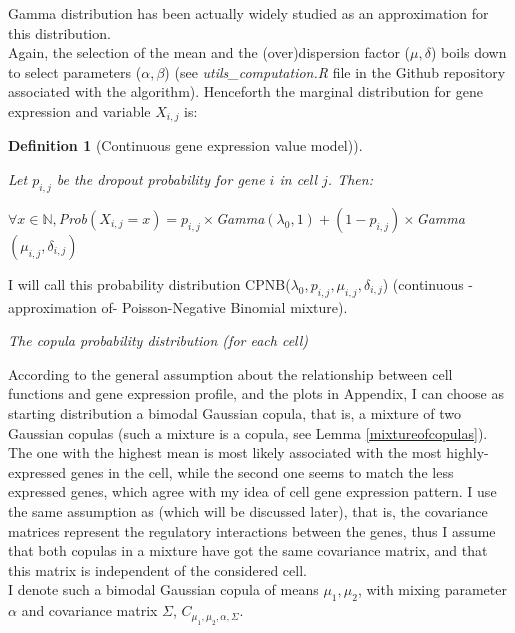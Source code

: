 \documentclass{report}
\newtheorem{definition}{Definition}[section]
\begin{document}
Gamma distribution has been actually widely studied as an approximation for this distribution\cite{guenther1972simple}\cite{best1974improved}.\\

Again, the selection of the mean and the (over)dispersion factor ($\mu, \delta$) boils down to select parameters ($\alpha, \beta$) (see \emph{utils\_computation.R} file in the Github repository associated with the algorithm). Henceforth the marginal distribution for gene expression and variable $X_{i,j}$ is:

\begin{definition}[Continuous gene expression value model)]\label{genexpressioncontinuous}{Let $p_{i,j}$ be the dropout probability for gene $i$ in cell $j$. Then:
\begin{center}$\forall x \in \mathbb{N}, $\textit{Prob}$(X_{i,j} = x) = p_{i,j} \times $\textit{Gamma}$(\lambda_0, 1) + (1-p_{i,j}) \times $\textit{Gamma}$(\mu_{i,j}, \delta_{i,j})$\end{center}}\end{definition}

I will call this probability distribution CPNB($\lambda_0, p_{i,j}, \mu_{i,j}, \delta_{i,j}$) (continuous -approximation of- Poisson-Negative Binomial mixture).

\bigskip
\noindent \textit{The copula probability distribution (for each cell)}
\bigskip

According to the general assumption about the relationship between cell functions and gene expression profile, and the plots in Appendix, I can choose as starting distribution a bimodal Gaussian copula, that is, a mixture of two Gaussian copulas (such a mixture is a copula, see Lemma \ref{mixtureofcopulas}). The one with the highest mean is most likely associated with the most highly-expressed genes in the cell, while the second one seems to match the less expressed genes, which agree with my idea of cell gene expression pattern. I use the same assumption as \cite{zhang2017classification} (which will be discussed later), that is, the covariance matrices represent the regulatory interactions between the genes, thus I assume that both copulas in a mixture have got the same covariance matrix, and that this matrix is independent of the considered cell.\\

I denote such a bimodal Gaussian copula of means $\mu_1, \mu_2$, with mixing parameter $\alpha$ and covariance matrix $\Sigma$, $C_{\mu_1, \mu_2, \alpha, \Sigma}$.\\
\end{document}
